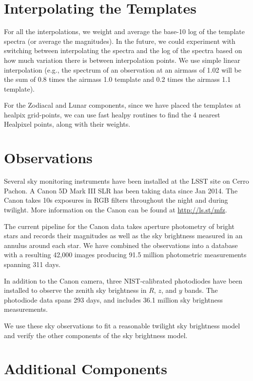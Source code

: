 \documentclass[]{spie}
\begin{document}
\section{Interpolating the Templates}\label{sec:interp}

For all the interpolations, we weight and average the base-10 log of the template spectra (or average the magnitudes).  In the future, we could experiment with switching between interpolating the spectra and the log of the spectra based on how much variation there is between interpolation points.  We use simple linear interpolation (e.g., the spectrum of an observation at an airmass of 1.02 will be the sum of 0.8 times the airmass 1.0 template and 0.2 times the airmass 1.1 template). 

For the Zodiacal and Lunar components, since we have placed the templates at healpix grid-points, we can use fast healpy routines to find the 4 nearest Healpixel points, along with their weights.  


\section{Observations}\label{sec:obs}

Several sky monitoring instruments have been installed at the LSST site on Cerro Pachon.  A Canon 5D Mark III SLR has been taking data since Jan 2014.  The Canon takes 10s exposures in RGB filters throughout the night and during twilight.  More information on the Canon can be found at \url{http://ls.st/mfz}.

The current pipeline for the Canon data takes aperture photometry of bright stars and records their magnitudes as well as the sky brightness measured in an annulus around each star.  We have combined the observations into a database with a resulting 42,000 images producing 91.5 million photometric measurements spanning 311 days.  

In addition to the Canon camera, three NIST-calibrated photodiodes have been installed to observe the zenith sky brightness in $R$, $z$, and $y$ bands. The photodiode data spans 293 days, and includes 36.1 million sky brightness measurements.

We use these sky observations to fit a reasonable twilight sky brightness model and verify the other components of the sky brightness model.

\section{Additional Components}\label{sec:twi}
\end{document}
